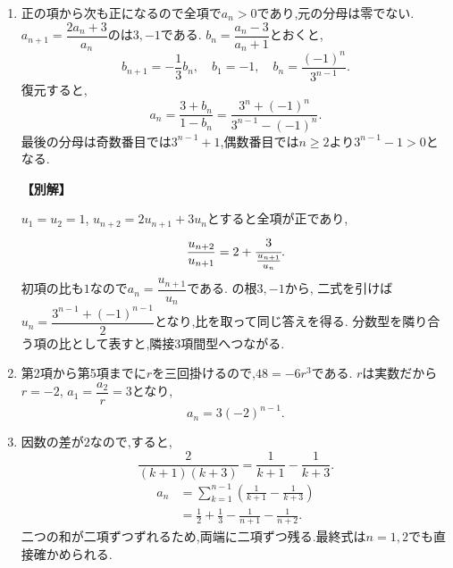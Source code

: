 \begin{enumerate}[label=\textbf{問\arabic*.},leftmargin=3.8em,format=\bookitemlink{practice-basic}{solution}{problem}]
          \item 正の項から次も正になるので全項で$a_n>0$であり,元の分母は零でない.
                  $a_{n+1}=\dfrac{2a_n+3}{a_n}$のは$3,-1$である.
                  $b_n=\dfrac{a_n-3}{a_n+1}$とおくと,
                  \[
                    b_{n+1}=-\frac13b_n,\quad b_1=-1,
                    \quad b_n=\frac{(-1)^n}{3^{n-1}}.
                  \]
                  復元すると,
                  \[
                    a_n=\frac{3+b_n}{1-b_n}
                       =\frac{3^n+(-1)^n}{3^{n-1}-(-1)^n}.
                  \]
                  最後の分母は奇数番目では$3^{n-1}+1$,偶数番目では$n\ge2$より$3^{n-1}-1>0$となる.
                  \par\smallskip\noindent\textbf{【別解】}\par
                  $u_1=u_2=1$, $u_{n+2}=2u_{n+1}+3u_n$とすると全項が正であり,
                  \[
                    \frac{u_{n+2}}{u_{n+1}}=2+\cfrac3{\frac{u_{n+1}}{u_n}}.
                  \]
                  初項の比も$1$なので$a_n=\dfrac{u_{n+1}}{u_n}$である.
                  の根$3,-1$から,
                  \BookMathLayout{\[
                    u_{n+1}+u_n=2\cdot3^{n-1},
                    \quad u_{n+1}-3u_n=-2(-1)^{n-1}.
                  \]}{\[
                  \begin{aligned}
                    u_{n+1}+u_n&=2\cdot3^{n-1},\\
                    u_{n+1}-3u_n&=-2(-1)^{n-1}.
                  \end{aligned}
                  \]}
                  二式を引けば$u_n=\dfrac{3^{n-1}+(-1)^{n-1}}{2}$となり,比を取って同じ答えを得る.
                  分数型を隣り合う項の比として表すと,隣接3項間型へつながる.

          \item 第2項から第5項までに$r$を三回掛けるので,$48=-6r^3$である.
                  $r$は実数だから$r=-2$, $a_1=\dfrac{a_2}{r}=3$となり,
                  \[
                    a_n=3(-2)^{n-1}.
                  \]

          \item 因数の差が$2$なので,すると,
                  \[
                    \frac2{(k+1)(k+3)}=\frac1{k+1}-\frac1{k+3}.
                  \]
                  \[
                  \begin{aligned}
                    a_n&=\sum_{k=1}^{n-1}\left(\frac1{k+1}-\frac1{k+3}\right)\\
                       &=\frac12+\frac13-\frac1{n+1}-\frac1{n+2}.
                  \end{aligned}
                  \]
                  二つの和が二項ずつずれるため,両端に二項ずつ残る.最終式は$n=1,2$でも直接確かめられる.


\end{enumerate}
